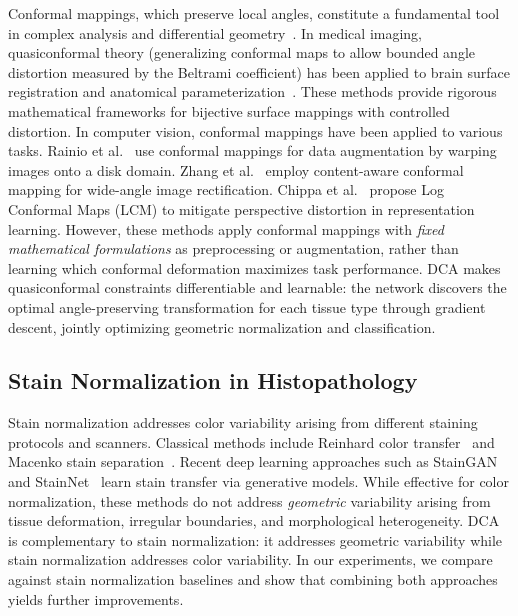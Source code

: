\documentclass[10pt,journal,compsoc]{IEEEtran}
\begin{document}
Conformal mappings, which preserve local angles, constitute a fundamental tool in complex analysis and differential geometry~\cite{ahlfors2006conformal}. In medical imaging, quasiconformal theory (generalizing conformal maps to allow bounded angle distortion measured by the Beltrami coefficient) has been applied to brain surface registration and anatomical parameterization~\cite{wang2015quasiconformal,lui2014brain}. These methods provide rigorous mathematical frameworks for bijective surface mappings with controlled distortion. In computer vision, conformal mappings have been applied to various tasks. Rainio et al.~\cite{rainio2023conformal} use conformal mappings for data augmentation by warping images onto a disk domain. Zhang et al.~\cite{zhang2023conformal} employ content-aware conformal mapping for wide-angle image rectification. Chippa et al.~\cite{chippa2024lcm} propose Log Conformal Maps (LCM) to mitigate perspective distortion in representation learning. However, these methods apply conformal mappings with \textit{fixed mathematical formulations} as preprocessing or augmentation, rather than learning which conformal deformation maximizes task performance. DCA makes quasiconformal constraints differentiable and learnable: the network discovers the optimal angle-preserving transformation for each tissue type through gradient descent, jointly optimizing geometric normalization and classification.

\subsection{Stain Normalization in Histopathology}

Stain normalization addresses color variability arising from different staining protocols and scanners. Classical methods include Reinhard color transfer~\cite{reinhard2001color} and Macenko stain separation~\cite{macenko2009method}. Recent deep learning approaches such as StainGAN~\cite{shaban2019staingan} and StainNet~\cite{kang2021stainnet} learn stain transfer via generative models. While effective for color normalization, these methods do not address \textit{geometric} variability arising from tissue deformation, irregular boundaries, and morphological heterogeneity. DCA is complementary to stain normalization: it addresses geometric variability while stain normalization addresses color variability. In our experiments, we compare against stain normalization baselines and show that combining both approaches yields further improvements.
\end{document}
